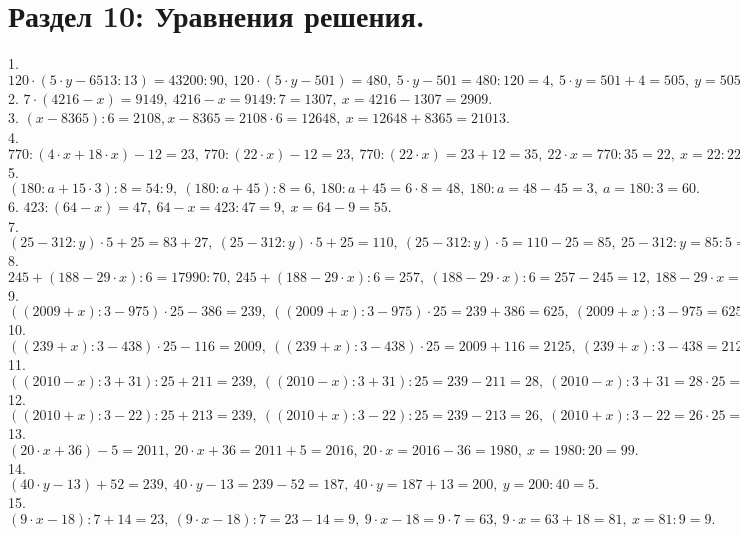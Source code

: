 \section{Раздел 10: Уравнения решения.}
1. $120\cdot(5\cdot y-6513:13)=43200:90,\ 120\cdot(5\cdot y-501)=480,\ 5\cdot y-501=480:120=4,\ 5\cdot y=501+4=505,\ y=505:5=101.$\\
2. $7\cdot(4216-x)=9149,\ 4216-x=9149:7=1307,\ x=4216-1307=2909.$\\
3. $(x-8365):6=2108, x-8365=2108\cdot6=12648,\ x=12648+8365=21013.$\\
4. $770:(4\cdot x+18\cdot x)-12=23,\ 770:(22\cdot x)-12=23,\ 770:(22\cdot x)=23+12=35,\ 22\cdot x=770:35=22,\ x=22:22=1.$\\
5. $(180:a+15\cdot3):8=54:9,\ (180:a+45):8=6,\ 180:a+45=6\cdot8=48,\ 180:a=48-45=3,\ a=180:3=60.$\\
6. $423:(64-x)=47,\ 64-x=423:47=9,\ x=64-9=55.$\\
7. $(25-312:y)\cdot5+25=83+27,\ (25-312:y)\cdot5+25=110,\ (25-312:y)\cdot5=110-25=85,\ 25-312:y=85:5=17,\ 312:y=25-17=8,\ y=312:8=39.$\\
8. $245+(188-29\cdot x):6=17990:70,\ 245+(188-29\cdot x):6=257,\ (188-29\cdot x):6=257-245=12,\ 188-29\cdot x=6\cdot12=72,\ 29\cdot x=188-72=116,\ x=116:29=4.$\\
9. $((2009+x):3-975)\cdot25-386=239,\ ((2009+x):3-975)\cdot25=239+386=625,\ (2009+x):3-975=625:25=25,\ (2009+x):3=25+975=1000,\ 2009+x=3\cdot1000=3000,\ x=3000-2009=991.$\\
10. $((239+x):3-438)\cdot25-116=2009,\ ((239+x):3-438)\cdot25=2009+116=2125,\ (239+x):3-438=2125:25=85,\ (239+x):3=438+85=523,\ 239+x=523\cdot3=1569,\ x=1569-239=1330.$\\
11. $((2010-x):3+31):25+211=239,\ ((2010-x):3+31):25=239-211=28,\ (2010-x):3+31=28\cdot25=700,\ (2010-x):3=700-31=669,\ 2010-x=669\cdot3=2007,\ x=2010-2007=3.$\\
12. $((2010+x):3-22):25+213=239,\ ((2010+x):3-22):25=239-213=26,\ (2010+x):3-22=26\cdot25=650,\ (2010+x):3=650+22=672,\ 2010+x=672\cdot3=2016,\ x=2016-2010=6.$\\
13. $(20\cdot x+36)-5=2011,\ 20\cdot x+36=2011+5=2016,\ 20\cdot x=2016-36=1980,\ x=1980:20=99.$\\
14. $(40\cdot y-13)+52=239,\ 40\cdot y-13=239-52=187,\ 40\cdot y=187+13=200,\ y=200:40=5.$\\
15. $(9\cdot x-18):7+14=23,\ (9\cdot x-18):7=23-14=9,\ 9\cdot x-18=9\cdot7=63,\ 9\cdot x=63+18=81,\ x=81:9=9.$\\
